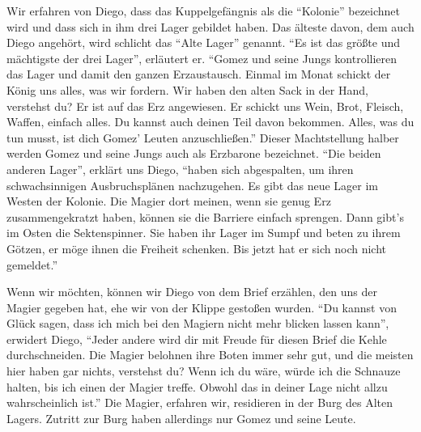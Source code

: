 \documentclass[a5paper,pagesize]{scrbook}
\begin{document}
Wir erfahren von Diego, dass das Kuppelgefängnis als die \enquote{Kolonie} bezeichnet wird und dass sich in ihm drei Lager gebildet haben.
Das älteste davon, dem auch Diego angehört, wird schlicht das \enquote{Alte Lager} genannt.
\enquote{Es ist das größte und mächtigste der drei Lager}, erläutert er.
\enquote{Gomez und seine Jungs kontrollieren das Lager und damit den ganzen Erzaustausch.
Einmal im Monat schickt der König uns alles, was wir fordern.
Wir haben den alten Sack in der Hand, verstehst du?
Er ist auf das Erz angewiesen.
Er schickt uns Wein, Brot, Fleisch, Waffen, einfach alles.
Du kannst auch deinen Teil davon bekommen.
Alles, was du tun musst, ist dich Gomez' Leuten anzuschließen.}
Dieser Machtstellung halber werden Gomez und seine Jungs auch als Erzbarone bezeichnet.
\enquote{Die beiden anderen Lager}, erklärt uns Diego, \enquote{haben sich abgespalten, um ihren schwachsinnigen Ausbruchsplänen nachzugehen.
Es gibt das neue Lager im Westen der Kolonie.
Die Magier dort meinen, wenn sie genug Erz zusammengekratzt haben, können sie die Barriere einfach sprengen.
Dann gibt's im Osten die Sektenspinner.
Sie haben ihr Lager im Sumpf und beten zu ihrem Götzen, er möge ihnen die Freiheit schenken.
Bis jetzt hat er sich noch nicht gemeldet.}

Wenn wir möchten, können wir Diego von dem Brief erzählen, den uns der Magier gegeben hat, ehe wir von der Klippe gestoßen wurden.
\enquote{Du kannst von Glück sagen, dass ich mich bei den Magiern nicht mehr blicken lassen kann}, erwidert Diego, \enquote{Jeder andere wird dir mit Freude für diesen Brief die Kehle durchschneiden.
Die Magier belohnen ihre Boten immer sehr gut, und die meisten hier haben gar nichts, verstehst du?
Wenn ich du wäre, würde ich die Schnauze halten, bis ich einen der Magier treffe.
Obwohl das in deiner Lage nicht allzu wahrscheinlich ist.}
Die Magier, erfahren wir, residieren in der Burg des Alten Lagers.
Zutritt zur Burg haben allerdings nur Gomez und seine Leute.
\end{document}

